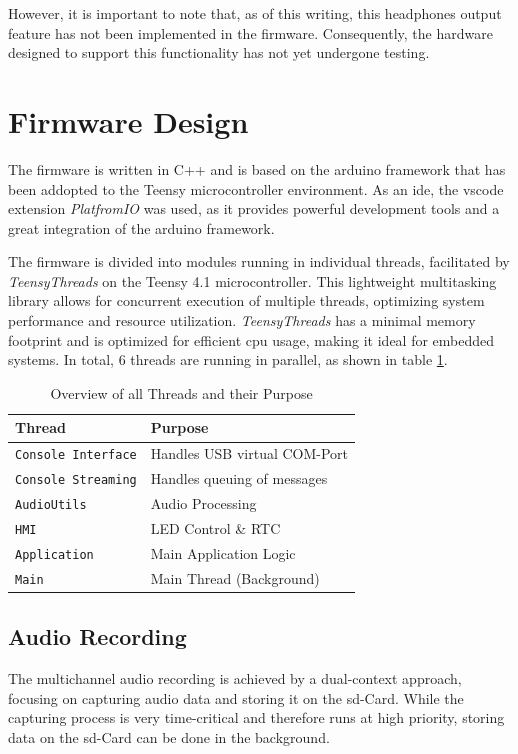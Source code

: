 However, it is important to note that, as of this writing, this headphones output feature has not been implemented in the firmware.
Consequently, the hardware designed to support this functionality has not yet undergone testing.


\newpage
\section{Firmware Design}
The firmware is written in C++ and is based on the \gls{arduino} framework that has been addopted to the Teensy microcontroller environment.
As an \acrshort{ide}, the \acrshort{vscode} extension \textit{PlatfromIO} was used, as it provides powerful development tools and a great integration of the \gls{arduino} framework.

The firmware is divided into modules running in individual threads, facilitated by \textit{TeensyThreads} on the Teensy 4.1 microcontroller.
This lightweight multitasking library allows for concurrent execution of multiple threads, optimizing system performance and resource utilization.
\textit{TeensyThreads} has a minimal memory footprint and is optimized for efficient \acrshort{cpu} usage, making it ideal for embedded systems.
In total, 6 threads are running in parallel, as shown in table \ref{tab:acquisition_system_threads}.
\begin{table}[h]
	\centering
	\begin{tabular}{|l|l|}
		\hline
		Thread                     & Purpose                      \\ \hline
		\texttt{Console Interface} & Handles USB virtual COM-Port \\ \hline
		\texttt{Console Streaming} & Handles queuing of messages  \\ \hline
		\texttt{AudioUtils}        & Audio Processing             \\ \hline
		\texttt{HMI}               & LED Control \& RTC           \\ \hline
		\texttt{Application}       & Main Application Logic       \\ \hline
		\texttt{Main}              & Main Thread (Background)     \\ \hline
	\end{tabular}
	\caption{Overview of all Threads and their Purpose}
	\label{tab:acquisition_system_threads}
\end{table}

\subsection{Audio Recording}
The multichannel audio recording is achieved by a dual-context approach, focusing on capturing audio data and storing it on the \acrshort{sd}-Card.
While the capturing process is very time-critical and therefore runs at high priority, storing data on the \acrshort{sd}-Card can be done in the background.

